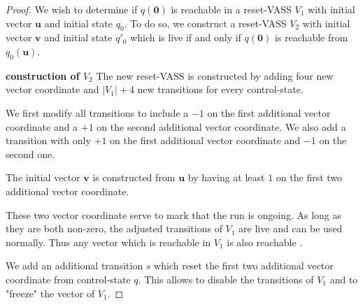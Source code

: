 \begin{proof}


We wish to determine if $q(\textbf{0})$ is reachable in a reset-VASS $V_1$
with
initial vector $\textbf{u}$ and initial state $q_0$.
To do so, we construct a reset-VASS $V_2$
with initial vector $\textbf{v}$ and initial state $q'_0$ 
which is live if and only if 
$q(\textbf{0})$
is reachable from $q_0(\textbf{u})$.

{\bf construction of $V_2$}
The new reset-VASS is constructed by adding four new vector coordinate
and
$|V_1|+4$ new transitions for every control-state.

We first modify all transitions to include a $-1$ on the first additional vector coordinate and a $+1$ on the second additional vector coordinate. We also add a transition with only $+1$ on the first additional vector coordinate and $-1$ on the second one.



The initial vector $\textbf{v}$ is constructed from $\textbf{u}$ by having at least $1$ on the first two additional vector coordinate.


These two vector coordinate serve to mark that the run is ongoing. As long as they are both non-zero, the adjusted transitions of $V_1$ are live and can be used normally. Thus any vector which is reachable in $V_1$ is also reachable%
.



We add an additional transition $s$ which reset the first two additional vector coordinate from control-state $q$.
This allows to disable the transitions of $V_1$ and to "freeze" the vector of $V_1$.


\end{proof}
